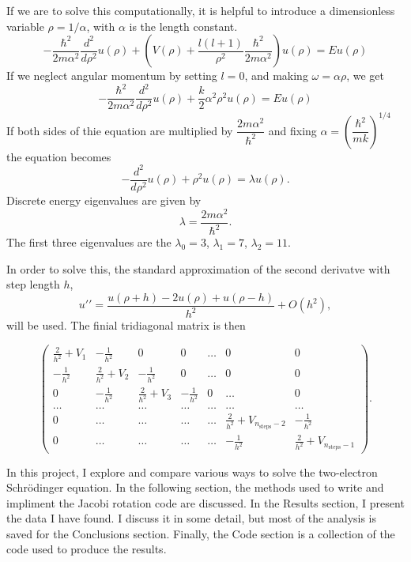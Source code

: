 \documentclass[11pt]{article}
\begin{document}
    If we are to solve this computationally, it is helpful to introduce a dimensionless variable $\rho = 1/\alpha$, with $\alpha$ is the length constant. 
    \[ -\dfrac{\hbar^2}{2m\alpha^2} \dfrac{d^2}{d\rho^2} u(\rho) + \left( V(\rho) + \dfrac{l(l+1)}{\rho^2} \dfrac{\hbar^2}{2m\alpha^2} \right) u(\rho) = Eu(\rho) \]
    If we neglect angular momentum by setting $l=0$, and making $\omega = \alpha \rho$, we get
    \[ -\dfrac{\hbar^2}{2m\alpha^2} \dfrac{d^2}{d\rho^2} u(\rho) + \dfrac{k}{2} \alpha^2 \rho^2 u(\rho) = Eu(\rho) \]
    If both sides of thie equation are multiplied by $\dfrac{2m\alpha^2}{\hbar^2}$ and fixing $\alpha = \left( \dfrac{\hbar^2}{mk} \right)^{1/4}$ the equation becomes
    \[ -\dfrac{d^2}{d\rho^2} u(\rho)+ \rho^2 u(\rho) = \lambda u(\rho). \]
    Discrete energy eigenvalues are given by
    \[ \lambda = \dfrac{2m\alpha^2}{\hbar^2}. \]
    The first three eigenvalues are the $\lambda_0 = 3$, $\lambda_1 = 7$, $\lambda_2 = 11$. 

    In order to solve this, the standard approximation of the second derivatve with step length $h$,
    \[ u\prime \prime = \dfrac{u(\rho+h)-2u(\rho)+u(\rho-h)}{h^2} + O(h^2) , \]
    will be used. The finial tridiagonal matrix is then

    \[
    \left( \begin{array}{ccccccc} \frac{2}{h^2}+V_1 & -\frac{1}{h^2} & 0   & 0    & \dots  &0     & 0 \\
    -\frac{1}{h^2} & \frac{2}{h^2}+V_2 & -\frac{1}{h^2} & 0    & \dots  &0     &0 \\
    0   & -\frac{1}{h^2} & \frac{2}{h^2}+V_3 & -\frac{1}{h^2}  &0       &\dots & 0\\
    \dots  & \dots & \dots & \dots  &\dots      &\dots & \dots\\
    0   & \dots & \dots & \dots  &\dots       &\frac{2}{h^2}+V_{n_{\mathrm{steps}}-2} & -\frac{1}{h^2}\\
    0   & \dots & \dots & \dots  &\dots       &-\frac{1}{h^2} & \frac{2}{h^2}+V_{n_{\mathrm{steps}}-1}
    \end{array} \right)  .
    \]

    In this project, I explore and compare various ways to solve the two-electron Schr\"{o}dinger equation. In the following section, the methods used to write and impliment the Jacobi rotation code are discussed. In the Results section, I present the data I have found. I discuss it in some detail, but most of the analysis is saved for the Conclusions section. Finally, the Code section is a collection of the code used to produce the results.
\end{document}

